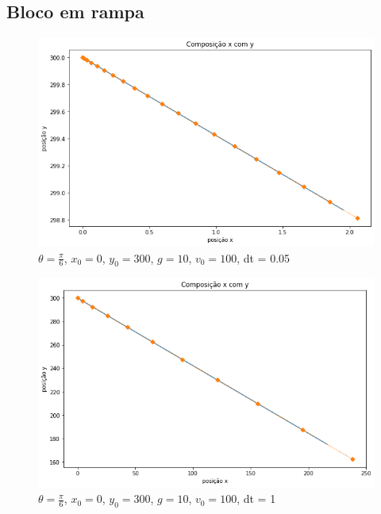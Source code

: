 \documentclass[12pt]{article}
\begin{document}
\subsection{Bloco em rampa}
\begin{figure}[H]
  \centering
  \includegraphics[scale = 0.6]{imagens/(blocoemrampa)composicaoxydt=0.05tf=1.png}
  \caption{$\theta = \frac{\pi}{6}$, $x_0 = 0$, $y_0 = 300$, $g = 10$, $v_0 = 100$, dt = 0.05}
\end{figure}
\begin{figure}[H]
  \centering
  \includegraphics[scale = 0.6]{imagens/(blocoemrampa)composicaoxydt=1tf=10.png}
  \caption{$\theta = \frac{\pi}{6}$, $x_0 = 0$, $y_0 = 300$, $g = 10$, $v_0 = 100$, dt = 1}
\end{figure}
\end{document}
